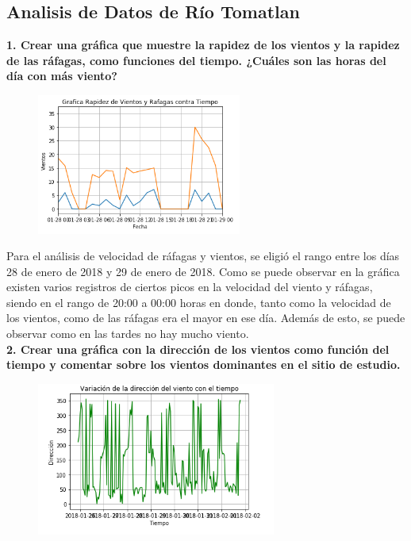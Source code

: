 \documentclass[12pt]{article}
\begin{document}
\newpage

\subsection{Analisis de Datos de Río Tomatlan}
\noindent\textbf {1. Crear una gráfica que muestre la rapidez de los vientos y la rapidez de las ráfagas, como funciones del tiempo. ¿Cuáles son las horas del día con más viento?} \\

\begin{figure}
    \centering
    \includegraphics[width=0.6\textwidth]{ViRa.png}
\end{figure}

Para el análisis de velocidad de ráfagas y vientos, se eligió el rango entre los días 28 de enero de 2018 y 29 de enero de 2018. Como se puede observar en la gráfica existen varios registros de ciertos picos en la velocidad del viento y ráfagas, siendo en el rango de 20:00 a 00:00 horas en donde, tanto como la velocidad de los vientos, como de las ráfagas era el mayor en ese día. Además de esto, se puede observar como en las tardes no hay mucho viento.\\


\noindent\textbf {2. Crear una gráfica con la dirección de los vientos como función del tiempo y comentar sobre los vientos dominantes en el sitio de estudio.} \\

\begin{figure}
    \centering
    \includegraphics[width=0.7\textwidth]{DirVi.png}
\end{figure}
\end{document}
